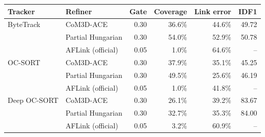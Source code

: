 \begin{tabular}{llrrrr}
\toprule
Tracker & Refiner & Gate & Coverage & Link error & IDF1 \\
\midrule
ByteTrack & CoM3D-ACE & 0.30 & 36.6\% & 44.6\% & 49.72 \\
 & Partial Hungarian & 0.30 & 54.0\% & 52.9\% & 50.78 \\
 & AFLink (official) & 0.05 & 1.0\% & 64.6\% & -- \\
\midrule
OC-SORT & CoM3D-ACE & 0.30 & 37.9\% & 35.1\% & 45.25 \\
 & Partial Hungarian & 0.30 & 49.5\% & 25.6\% & 46.19 \\
 & AFLink (official) & 0.05 & 1.0\% & 41.8\% & -- \\
\midrule
Deep OC-SORT & CoM3D-ACE & 0.30 & 26.1\% & 39.2\% & 83.67 \\
 & Partial Hungarian & 0.30 & 32.7\% & 35.3\% & 84.00 \\
 & AFLink (official) & 0.05 & 3.2\% & 60.9\% & -- \\
\bottomrule
\end{tabular}
